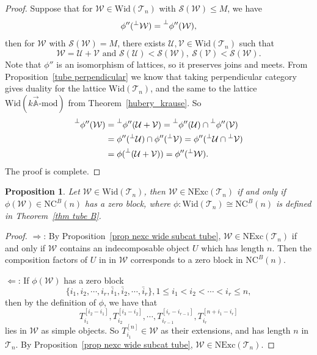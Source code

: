 \documentclass[a4paper, 11pt, reqno]{amsart}
\numberwithin{equation}{section}
\newtheorem{prop}[thm]{Proposition}
\theoremstyle{remark}
\theoremstyle{definition}
\begin{document}
\begin{proof}
   Suppose that for $\mathcal W \in \mathrm{Wid}(\mathcal T_n)$ with $\mathcal S(\mathcal W) \leq M$, we have  
   \[
      \phi''(\prescript{\perp}{}{\mathcal W})=\prescript{\perp}{}{\phi''(\mathcal W)},
   \]
   then for $\mathcal W$ with $\mathcal S(\mathcal W) = M$, there exists $\mathcal U, \mathcal V \in \mathrm{Wid}(\mathcal T_n)$ such that 
   \[
      \mathcal W=\mathcal U+\mathcal V \text{ and } \mathcal S(\mathcal U)<\mathcal S(\mathcal W), \ \mathcal S(\mathcal V)<\mathcal S(\mathcal W).
   \]
   Note that $\phi''$ is an isomorphism of lattices, so it preserves joins and meets. From Proposition~\ref{tube perpendicular} we know that taking perpendicular category gives duality for the lattice $\mathrm{Wid}(\mathcal T_n)$, and the same to the lattice $\mathrm{Wid}(k \vec{\mathbb A} \text{-} \mathrm{mod})$ from Theorem~\ref{hubery_krause}. So
   \begin{align*}
      \prescript{\perp}{}{\phi''(\mathcal W)}&=\prescript{\perp}{}{\phi''(\mathcal U+\mathcal V)}=\prescript{\perp}{}{\phi''(\mathcal U)} \cap \prescript{\perp}{}{\phi''(\mathcal V)} \\
      &=\phi''(\prescript{\perp}{}{\mathcal U}) \cap \phi''(\prescript{\perp}{}{\mathcal V}) =\phi''(\prescript{\perp}{}{\mathcal U} \cap \prescript{\perp}{}{\mathcal V}) \\
      &=\phi(\prescript{\perp}{}{(\mathcal U+\mathcal V)})=\phi''(\prescript{\perp}{}{\mathcal W}).
   \end{align*}
   The proof is complete.
\end{proof}

\begin{prop} \label{prop subcat zero block}
   Let $\mathcal W \in \mathrm{Wid}(\mathcal T_n)$, then $\mathcal W \in \mathrm{NExc}(\mathcal T_n)$ if and only if $\phi(\mathcal W) \in \mathrm{NC}^B(n)$ has a zero block, where $\phi:\mathrm{Wid}(\mathcal T_n) \cong \mathrm{NC}^B(n)$ is defined in Theorem~\ref{thm tube B}.
\end{prop}

\begin{proof}
   $\Rightarrow$: By Proposition~\ref{prop nexc wide subcat tube}, $\mathcal W \in \mathrm{NExc}(\mathcal T_n)$ if and only if $\mathcal W$ contains an indecomposable object $U$ which has length $n$. Then the composition factors of $U$ in in $\mathcal W$ corresponds to a zero block in $\mathrm{NC}^B(n)$.

   $\Leftarrow$: If $\phi (\mathcal W)$ has a zero block 
   \[\{i_1, i_2,\cdots,i_r, \bar{i}_1, \bar{i}_2, \cdots, \bar{i}_r \}, 1 \leq i_1<i_2<\cdots<i_r \leq n,\]
   then by the definition of $\phi$, we have that 
   \[T_{i_1}^{[i_2-i_1]}, T_{i_2}^{[i_3-i_2]}, \cdots, T_{i_{r-1}}^{[i_r-i_{r-1}]}, T_{i_r}^{[n+i_1-i_r]} \] 
   lies in $\mathcal W$ as simple objects. So $T_{i_1}^{[n]} \in \mathcal W$ as their extensions, and has length $n$ in $\mathcal T_n$. By Proposition~\ref{prop nexc wide subcat tube}, $\mathcal W \in \mathrm{NExc}(\mathcal T_n)$.
\end{proof}
\end{document}
